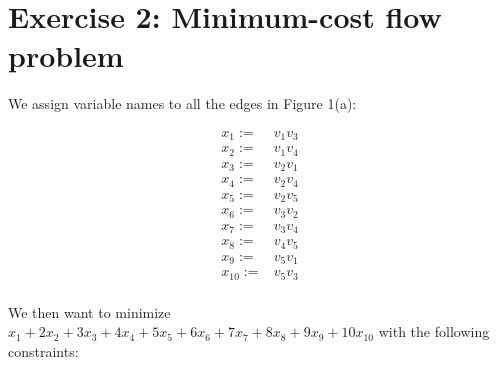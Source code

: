 \documentclass[11pt,a4paper,english]{article}
\begin{document}
\section{Exercise 2: Minimum-cost flow problem}
 
We assign variable names to all the edges in Figure 1(a):
 
\begin{align*}
 x_1 :=& v_1v_3 \\
 x_2 :=& v_1v_4 \\
 x_3 :=& v_2v_1 \\
 x_4 :=& v_2v_4 \\
 x_5 :=& v_2v_5 \\
 x_6 :=& v_3v_2 \\
 x_7 :=& v_3v_4 \\
 x_8 :=& v_4v_5 \\
 x_9 :=& v_5v_1 \\
 x_{10} :=& v_5v_3 \\
\end{align*}
 
We then want to minimize                                                      
$x_1+2x_2+3x_3+4x_4+5x_5+6x_6+7x_7+8x_8+9x_9+10x_{10}$ with the following     
constraints:                                                                  
\end{document}
